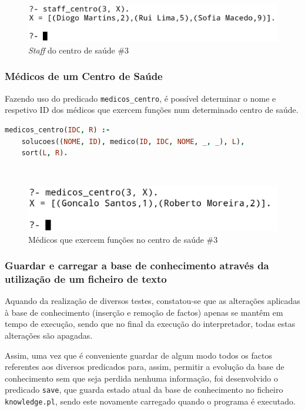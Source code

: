 \documentclass[a4paper, 11pt]{article}
\begin{document}
\

\begin{figure}[H]
    \centering
    \includegraphics[width=.7\textwidth]{img/staff_centro.png}
    \caption{\textit{Staff} do centro de saúde \#3}
\end{figure}

\subsubsection{Médicos de um Centro de Saúde}

Fazendo uso do predicado \texttt{medicos\_centro}, é possível determinar o nome e respetivo ID dos médicos que exercem
funções num determinado centro de saúde.

\begin{lstlisting}[language=Prolog, caption={Extensão do predicado \texttt{medicos\_centro}}]
% Extensao do predicado medicos_centro: IDC, R -> {V, F}
medicos_centro(IDC, R) :- 
    solucoes((NOME, ID), medico(ID, IDC, NOME, _, _), L),
    sort(L, R).
\end{lstlisting}

\

\begin{figure}[H]
    \centering
    \includegraphics[width=.65\textwidth]{img/medicos_centro.png}
    \caption{Médicos que exercem funções no centro de saúde \#3}
\end{figure}

\subsubsection{Guardar e carregar a base de conhecimento através  da utilização de um ficheiro de texto}

Aquando da realização de diversos testes, constatou-se que as alterações aplicadas à base de conhecimento (inserção e
remoção de factos) apenas se mantêm em tempo de execução, sendo que no final da execução do interpretador, todas estas
alterações são apagadas.

Assim, uma vez que é conveniente guardar de algum modo todos os factos referentes aos  diversos predicados para, assim,
permitir a evolução da base de conhecimento sem que seja perdida nenhuma informação, foi desenvolvido o predicado \texttt{save},
que guarda estado atual da base de conhecimento no ficheiro \texttt{knowledge.pl}, sendo este novamente carregado quando
o programa é executado.
\end{document}
